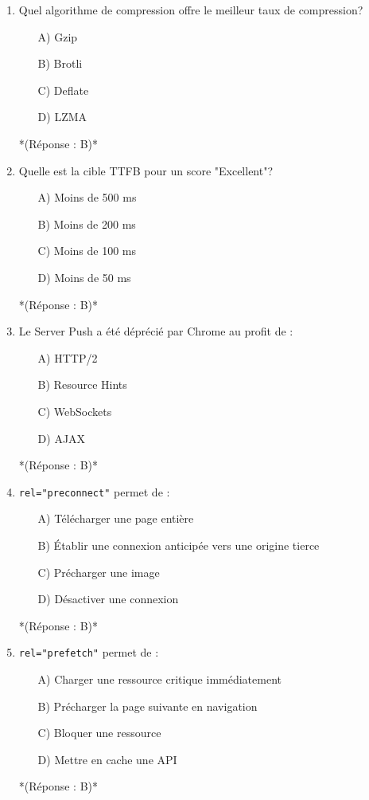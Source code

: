 \documentclass[12pt,a4paper,twoside]{report}
\begin{document}
\begin{enumerate}
\item Quel algorithme de compression offre le meilleur taux de compression?
\begin{itemize}
\item[A)] Gzip
\item[B)] Brotli
\item[C)] Deflate
\item[D)] LZMA
\end{itemize}
*(Réponse : B)*

\item Quelle est la cible TTFB pour un score "Excellent"?
\begin{itemize}
\item[A)] Moins de 500 ms
\item[B)] Moins de 200 ms
\item[C)] Moins de 100 ms
\item[D)] Moins de 50 ms
\end{itemize}
*(Réponse : B)*

\item Le Server Push a été déprécié par Chrome au profit de :
\begin{itemize}
\item[A)] HTTP/2
\item[B)] Resource Hints
\item[C)] WebSockets
\item[D)] AJAX
\end{itemize}
*(Réponse : B)*

\item \texttt{rel="preconnect"} permet de :
\begin{itemize}
\item[A)] Télécharger une page entière
\item[B)] Établir une connexion anticipée vers une origine tierce
\item[C)] Précharger une image
\item[D)] Désactiver une connexion
\end{itemize}
*(Réponse : B)*

\item \texttt{rel="prefetch"} permet de :
\begin{itemize}
\item[A)] Charger une ressource critique immédiatement
\item[B)] Précharger la page suivante en navigation
\item[C)] Bloquer une ressource
\item[D)] Mettre en cache une API
\end{itemize}
*(Réponse : B)*


\end{enumerate}
\end{document}
